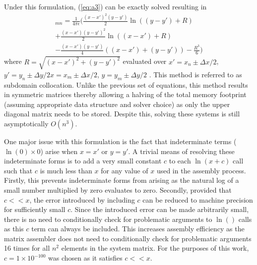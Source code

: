 Under this formulation, (\ref{eq:a3}) can be exactly solved resulting in
\begin{multline}
    [A]_{mn}=\frac{1}{4\pi\epsilon}\Big(\frac{(x-x')^2(y-y')}{2}\ln((y-y')+R) \\ +\frac{(x-x')(y-y')^2}{2}\ln((x-x')+R)\\-\frac{(x-x')(y-y')}{4}((x-x')+(y-y')) -\frac{R^3}{6}\Big)
\end{multline}
where $R=\sqrt{(x-x')^2+(y-y')^2}$ evaluated over $x'=x_n\pm\Delta x / 2$, $y'=y_n\pm\Delta y / 2 x=x_m\pm\Delta x / 2$, $y=y_m\pm\Delta y / 2$ \cite{jin2011theory}. This method is referred to as subdomain collocation. Unlike the previous set of equations, this method results in symmetric matrices thereby allowing a halving of the total memory footprint (assuming appropriate data structure and solver choice) as only the upper diagonal matrix needs to be stored. Despite this, solving these systems is still asymptotically $O(n^3)$.

One major issue with this formulation is the fact that indeterminate terms ($\ln(0)\times 0$) arise when $x=x'$ or $y=y'$. A trivial means of resolving these indeterminate forms is to add a very small constant $c$ to each $\ln(x+c)$ call such that $c$ is much less than $x$ for any value of $x$ used in the assembly process. Firstly, this prevents indeterminate forms from arising as the natural log of a small number multiplied by zero evaluates to zero. Secondly, provided that $c<<x$, the error introduced by including $c$ can be reduced to machine precision for sufficiently small $c$. Since the introduced error can be made arbitrarily small, there is no need to conditionally check for problematic arguments to $\ln()$ calls as this $c$ term can always be included. This increases assembly efficiency as the matrix assembler does not need to conditionally check for problematic arguments 16 times for all $n^2$ elements in the system matrix. For the purposes of this work, $c=1\times10^{-100}$ was chosen as it satisfies $c<<x$.